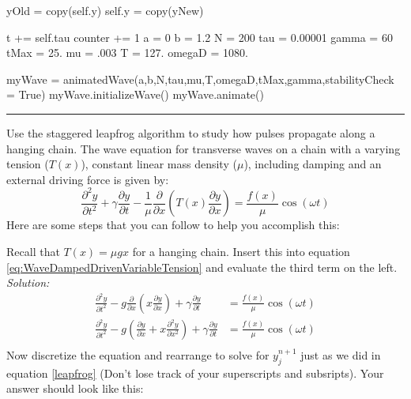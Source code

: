 \begin{codeexample}
\begin{VerbatimOut}{\listingFile}
            yOld = copy(self.y)
            self.y = copy(yNew)


            t += self.tau
            counter += 1
a = 0
b = 1.2
N = 200
tau = 0.00001
gamma = 60
tMax = 25.
mu = .003
T = 127.
omegaD = 1080.


myWave = animatedWave(a,b,N,tau,mu,T,omegaD,tMax,gamma,stabilityCheck = True)
myWave.initializeWave()
myWave.animate()

\end{VerbatimOut}
\end{codeexample}
\else
\noindent\rule{5 in}{0.01 in}
\fi


\begin{enumerate}
  \prob Use the staggered leapfrog algorithm to study how pulses
  propagate along a hanging chain. 
The wave equation for transverse waves on a chain with a varying
tension ($T(x)$), constant linear mass density ($\mu$), including
damping and an external driving force is given by:
\begin{equation}\label{eq:WaveDampedDrivenVariableTension}
    \frac{\partial^2 y}{\partial t^2} + \gamma \frac{\partial
    y}{\partial t} - \frac{1}{\mu}\frac{\partial }{\partial x}\left(T(x)
    \frac{\partial y }{\partial x} \right) =
    \frac{f(x)}{\mu} \cos(\omega t)
\end{equation}
Here are some steps that you can follow to help you accomplish this:
\begin{enumerate}
\subprob \label{P:14.3}Recall that $T(x) = \mu g x$ for a hanging chain.  Insert
this into equation \eqref{eq:WaveDampedDrivenVariableTension} and
evaluate the third term on the left.\\
\ifsolutions
\textit{Solution:}
\begin{align}
\frac{\partial ^2y}{\partial t^2} - g \frac{\partial}{\partial
  x} \left( x \frac{\partial y}{\partial x}\right) + \gamma
\frac{\partial y}{\partial t} &= \frac{f(x)}{\mu} \cos(\omega t)\\
\frac{\partial ^2y}{\partial t^2} - g \left( \frac{\partial
    y}{\partial x} + x \frac{\partial^2 y}{\partial x^2}\right) + \gamma
\frac{\partial y}{\partial t} &= \frac{f(x)}{\mu} \cos(\omega t)\\
\end{align}
\fi
\subprob Now discretize the equation and rearrange to solve for
$y_j^{n+1}$ just as we did in equation \eqref{leapfrog} (Don't lose
track of your superscripts and subsripts).  Your answer should look
like this:
\begin{multline}

\end{multline}
\end{enumerate}
\end{enumerate}
